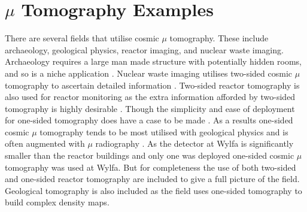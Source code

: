 \section{$\mu$ Tomography Examples} \label{sec:muTomographyExamples}
There are several fields that utilise cosmic $\mu$ tomography. These include archaeology, geological physics, reactor imaging, and nuclear waste imaging. Archaeology requires a large man made structure with potentially hidden rooms, and so is a niche application \cite{Alvarez_Pyramids_1970}. Nuclear waste imaging utilises two-sided cosmic $\mu$ tomography to ascertain detailed information \cite{jonkmans2013nuclear}. Two-sided reactor tomography is also used for reactor monitoring as the extra information afforded by two-sided tomography is highly desirable \cite{miyadera2013imaging} \cite{perry_imaging_2013} \cite{morris2014analysis}. Though the simplicity and ease of deployment for one-sided tomography does have a case to be made \cite{Erlandson_reactorOST_2018} \cite{Fujii_ReactorRadiography_2019}. As a results one-sided cosmic $\mu$ tomography tends to be most utilised with geological physics and is often augmented with $\mu$ radiography \cite{Tanaka_mtAsama_2007} \cite{Marteau_2017}. As the detector at Wylfa is significantly smaller than the reactor buildings and only one was deployed one-sided cosmic $\mu$ tomography was used at Wylfa. But for completeness the use of both two-sided and one-sided reactor tomography are included to give a full picture of the field. Geological tomography is also included as the field uses one-sided tomography to build complex density maps. 


